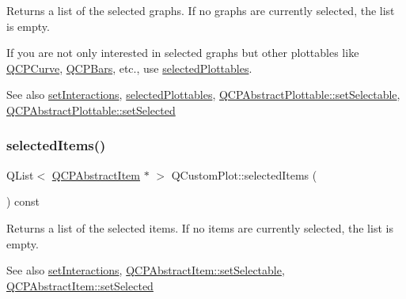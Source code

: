 Returns a list of the selected graphs. If no graphs are currently selected, the list is empty.

If you are not only interested in selected graphs but other plottables like \hyperlink{class_q_c_p_curve}{Q\+C\+P\+Curve}, \hyperlink{class_q_c_p_bars}{Q\+C\+P\+Bars}, etc., use \hyperlink{class_q_custom_plot_a747faaab57c56891e901a1e97fa4359a}{selected\+Plottables}.

\begin{DoxySeeAlso}{See also}
\hyperlink{class_q_custom_plot_a5ee1e2f6ae27419deca53e75907c27e5}{set\+Interactions}, \hyperlink{class_q_custom_plot_a747faaab57c56891e901a1e97fa4359a}{selected\+Plottables}, \hyperlink{class_q_c_p_abstract_plottable_a22c69299eb5569e0f6bf084877a37dc4}{Q\+C\+P\+Abstract\+Plottable\+::set\+Selectable}, \hyperlink{class_q_c_p_abstract_plottable_afbd5428c2952f59d952e11ab5cd79176}{Q\+C\+P\+Abstract\+Plottable\+::set\+Selected} 
\end{DoxySeeAlso}
\hypertarget{class_q_custom_plot_afda487bcf2d6cf1a57173d82495e29ba}{}\label{class_q_custom_plot_afda487bcf2d6cf1a57173d82495e29ba} 
\subsubsection{\texorpdfstring{selected\+Items()}{selectedItems()}}
{\footnotesize\ttfamily Q\+List$<$ \hyperlink{class_q_c_p_abstract_item}{Q\+C\+P\+Abstract\+Item} $\ast$ $>$ Q\+Custom\+Plot\+::selected\+Items (\begin{DoxyParamCaption}{ }\end{DoxyParamCaption}) const}

Returns a list of the selected items. If no items are currently selected, the list is empty.

\begin{DoxySeeAlso}{See also}
\hyperlink{class_q_custom_plot_a5ee1e2f6ae27419deca53e75907c27e5}{set\+Interactions}, \hyperlink{class_q_c_p_abstract_item_a8a8e32a55bc478b849756a78c2d87fd2}{Q\+C\+P\+Abstract\+Item\+::set\+Selectable}, \hyperlink{class_q_c_p_abstract_item_a203de94ad586cc44d16c9565f49d3378}{Q\+C\+P\+Abstract\+Item\+::set\+Selected} 
\end{DoxySeeAlso}
\hypertarget{class_q_custom_plot_ac87624ddff1cbf4064781a8e8ae321c4}{}\label{class_q_custom_plot_ac87624ddff1cbf4064781a8e8ae321c4} 
